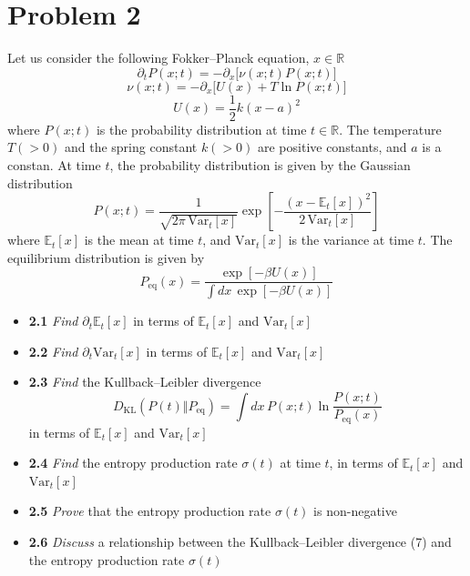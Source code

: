 \documentclass[11pt]{article}
\begin{document}
	\section{Problem 2}
	Let us consider the following Fokker–Planck equation, $x \in \mathbb{R}$
	\begin{equation}
		\partial_t P(x;t) = -\partial_x\big[\nu(x;t)P(x;t)\big]
		\tag{2}
	\end{equation}
	\begin{equation}
		\nu(x;t) = -\partial_x\big[U(x) + T\ln P(x;t)\big]
		\tag{3}
	\end{equation}
	\begin{equation}
		U(x) = \frac{1}{2}k(x-a)^2
		\tag{4}
	\end{equation}
	where $P(x;t)$ is the probability distribution at time $t \in \mathbb{R}$. The temperature $T(>0)$ and the spring constant $k(>0)$ are positive constants, and $a$ is a constan. At time $t$, the probability distribution is given by the Gaussian distribution
	\begin{equation}
		P(x;t)=\frac{1}{\sqrt{2\pi\,\mathrm{Var}_t[x]}}
		\exp\left[-\frac{(x-\mathbb{E}_t[x])^2}{2\,\mathrm{Var}_t[x]}\right]
		\tag{5}
	\end{equation}
	where $\mathbb{E}_t[x]$ is the mean at time $t$, and $\mathrm{Var}_t[x]$ is the variance at time $t$. The equilibrium distribution is given by
	\begin{equation}
		P_{\mathrm{eq}}(x)=
		\frac{\exp[-\beta U(x)]}{\int dx\,\exp[-\beta U(x)]}
		\tag{6}
	\end{equation}
	\begin{itemize}
		\item\textbf{2.1}
		\emph{Find} $\partial_t\mathbb{E}_t[x]$ in terms of $\mathbb{E}_t[x]$ and $\mathrm{Var}_t[x]$
		\item\textbf{2.2}
		\emph{Find} $\partial_t\mathrm{Var}_t[x]$ in terms of $\mathbb{E}_t[x]$ and $\mathrm{Var}_t[x]$
		\item\textbf{2.3}
		\emph{Find} the Kullback–Leibler divergence
		\begin{equation}
			D_{\mathrm{KL}}(P(t)\Vert P_{\mathrm{eq}})
			=
			\int dx\,P(x;t)\ln\frac{P(x;t)}{P_{\mathrm{eq}}(x)}
			\tag{7}
		\end{equation}
		in terms of $\mathbb{E}_t[x]$ and $\mathrm{Var}_t[x]$
		\item\textbf{2.4}
		\emph{Find} the entropy production rate $\sigma(t)$ at time $t$, in terms of $\mathbb{E}_t[x]$ and $\mathrm{Var}_t[x]$
		\item\textbf{2.5}
		\emph{Prove} that the entropy production rate $\sigma(t)$ is non-negative
		\item\textbf{2.6}
		\emph{Discuss} a relationship between the Kullback–Leibler divergence (7) and the entropy production rate $\sigma(t)$
	\end{itemize}
\end{document}
